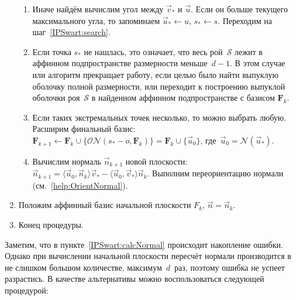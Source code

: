 \documentclass[a4paper,12pt]{article}
\newcommand{\Swarm}{\mathcal{S}}              %
\newcommand{\set}[2][]{#1\{ #2 #1\}}                    %
\newcommand{\scalprod}[3][]{#1\langle #2, #3 #1\rangle} %
\newcommand{\Norm}[2][]{\mathcal{N}#1( #2 #1)} %
\newcommand{\ONorm}[3][]{\mathcal{ON}#1( #2, #3 #1)} %
\newcommand{\FinalVec}{\mathbf{F}} %
\newcommand{\Plane}{\mathcal{L}}           %
\renewcommand{\.}{\hspace{0.2ex}}
\begin{document}
\begin{enumerate}
\begin{enumerate}
        \item Иначе найдём вычислим угол между $\vec v_*$ и $\vec u$. Если он больше текущего максимального угла, то запоминаем $\vec u_* \leftarrow u$, $s_* \leftarrow s$. Переходим на шаг~\ref{IPSwart:search}.


        \item Если точка $s_*$ не нашлась, это означает, что весь рой~$\Swarm$ лежит в аффинном подпространстве размерности меньше~$d-1$. В этом случае или алгоритм прекращает работу, если целью было найти выпуклую оболочку полной размерности, или переходит к построению выпуклой оболочки роя~$\Swarm$ в найденном аффинном подпространстве с базисом $\FinalVec_k$.
        \label{IPSwart:notFullDimBasis}


        \item  Если таких экстремальных точек несколько, то можно выбрать любую. Расширим финальный базис: $\FinalVec_{k+1} \leftarrow \FinalVec_k \cup \set[\big]{\ONorm{s_* - o}{\FinalVec_k}} = \FinalVec_k \cup \set[\big]{\vec u_0}$, где~$\vec u_0 = \Norm{\vec u_*}$.


        \item Вычислим нормаль $\vec n_{k+1}$ новой плоскости: $\vec n_{k+1} = \scalprod{\vec u_0}{\vec n_k}\vec v_* - \scalprod{\vec u_0}{\vec v_*}\vec n_k$. Выполним переориентацию нормали (см.~\ref{help:OrientNormal}). 
        \label{IPSwart:calcNormal}


      \end{enumerate}


      \item Положим аффинный базис начальной плоскости $F_k$, $\vec n = \vec n_k$.

      \item Конец процедуры.
    \end{enumerate}
    
    Заметим, что в пункте~\ref{IPSwart:calcNormal} происходит накопление ошибки. Однако при вычислении начальной плоскости пересчёт нормали производится в не слишком большом количестве, максимум~$d$~раз, поэтому ошибка не успеет разрастись. В качестве альтернативы можно воспользоваться следующей процедурой:
\end{document}
